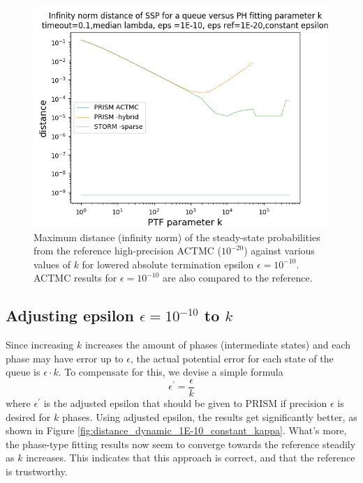 \documentclass[paper=a4, fontsize=11pt]{scrartcl}
\numberwithin{equation}{section}		%
\numberwithin{figure}{section}			%
\numberwithin{table}{section}				%
\begin{document}
	
	\begin{figure}[H]
		\begin{center}
			\includegraphics[trim=0.2cm 0cm 0cm 1.35cm,width=15cm, clip]{picture/New_model/1E-10/distance_constant_1E-10.png}
		\end{center}
		\caption{Maximum distance (infinity norm) of the steady-state probabilities from the reference high-precision ACTMC ($10^{-20}$) against various values of $k$ for lowered absolute termination epsilon $\epsilon = 10^{-10}$. ACTMC results for $\epsilon = 10^{-10}$ are also compared to the reference.}
		\label{fig:distance_constant_1E-10_constant_kappa}
	\end{figure}
	
	\pagebreak
	\subsection{Adjusting epsilon $\epsilon = 10^{-10}$ to $k$}
	\label{S:2.3}
	
	Since increasing $k$ increases the amount of phases (intermediate states) and each phase may have error up to $\epsilon$, the actual potential error for each state of the queue is $\epsilon \cdot k$. To compensate for this, we devise a simple formula
	$$\epsilon^{'} = \frac{\epsilon}{k}$$
	where $\epsilon^{'}$ is the adjusted epsilon that should be given to PRISM if precision $\epsilon$ is desired for $k$ phases.
	Using adjusted epsilon, the results get significantly better, as shown in Figure \ref{fig:distance_dynamic_1E-10_constant_kappa}. What's more, the phase-type fitting results now seem to converge towards the reference steadily as $k$ increases. This indicates that this approach is correct, and that the reference is trustworthy.
	
\end{document}
